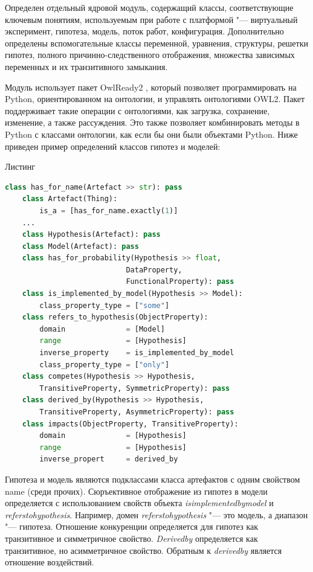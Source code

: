 Определен отдельный ядровой модуль, содержащий классы, соответствующие ключевым понятиям, используемым при работе 
с платформой "--- виртуальный эксперимент, гипотеза, модель, поток работ, конфигурация. Дополнительно определены 
вспомогательные классы переменной, уравнения, структуры, решетки гипотез, полного причинно-следственного отображения, 
множества зависимых переменных и их транзитивного замыкания. 

Модуль использует пакет OwlReady2 \cite{Lamy2017}, который позволяет программировать на Python, ориентированном на 
онтологии, и управлять онтологиями OWL2. Пакет поддерживает такие операции с онтологиями, как загрузка, сохранение, 
изменение, а также рассуждения. Это также позволяет комбинировать методы в Python с классами онтологии, как если бы 
они были объектами Python. Ниже приведен пример определений классов гипотез и моделей:

\begin{ListingEnv}[!h]%
    \captiondelim{ } %
    \caption{Листинг}\label{lst:hwbeauty}
    \begin{lstlisting}[language={Python}]
    class has_for_name(Artefact >> str): pass
    class Artefact(Thing):
        is_a = [has_for_name.exactly(1)]
    ...
    class Hypothesis(Artefact): pass
    class Model(Artefact): pass
    class has_for_probability(Hypothesis >> float,
                            DataProperty,
                            FunctionalProperty): pass
    class is_implemented_by_model(Hypothesis >> Model): 
        class_property_type = ["some"]
    class refers_to_hypothesis(ObjectProperty):
        domain              = [Model]
        range               = [Hypothesis]
        inverse_property    = is_implemented_by_model
        class_property_type = ["only"]
    class competes(Hypothesis >> Hypothesis, 
        TransitiveProperty, SymmetricProperty): pass
    class derived_by(Hypothesis >> Hypothesis, 
        TransitiveProperty, AsymmetricProperty): pass
    class impacts(ObjectProperty, TransitiveProperty):
        domain              = [Hypothesis]
        range               = [Hypothesis]
        inverse_propert     = derived_by
    \end{lstlisting}
\end{ListingEnv}%

Гипотеза и модель являются подклассами класса артефактов с одним свойством name (среди прочих). Сюръективное 
отображение из гипотез в модели определяется с использованием свойств объекта 
\textit{is\textunderscore implemented\textunderscore by\textunderscore model} и 
\textit{refers\textunderscore to\textunderscore hypothesis}. Например, домен 
\textit{refers\textunderscore to\textunderscore hypothesis} "--- это модель, а диапазон "--- гипотеза. Отношение 
конкуренции определяется для гипотез как транзитивное и симметричное свойство. \textit{Derived\textunderscore by} 
определяется как транзитивное, но асимметричное свойство. Обратным к \textit{derived\textunderscore by} 
является отношение воздействий.

